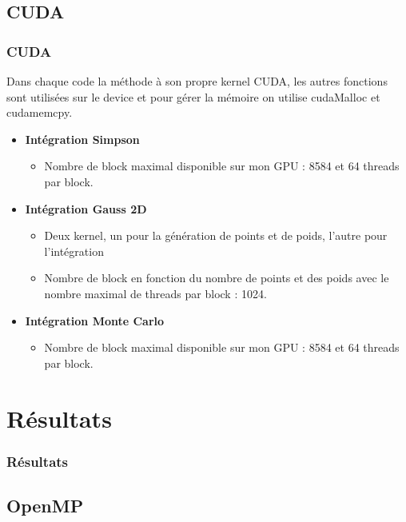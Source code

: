 \documentclass[10pt]{beamer}
\begin{document}
\subsection{CUDA}
\begin{frame}
    \frametitle{CUDA}
        \small
    Dans chaque code la méthode à son propre kernel CUDA, les autres fonctions sont utilisées sur le device et pour gérer la mémoire on utilise cudaMalloc et cudamemcpy.
    \begin{itemize}
     \item \textbf{Intégration Simpson}
            \begin{itemize}
                \item Nombre de block maximal disponible sur mon GPU : 8584 et 64 threads par block.
            \end{itemize}
        \item \textbf{Intégration Gauss 2D}
            \begin{itemize}
                \item Deux kernel, un pour la génération de points et de poids, l'autre pour l'intégration
                \item Nombre de block en fonction du nombre de points et des poids avec le nombre maximal de threads par block : 1024. 
            \end{itemize}
        \item \textbf{Intégration Monte Carlo }
            \begin{itemize}
                \item Nombre de block maximal disponible sur mon GPU : 8584 et 64 threads par block.
            \end{itemize}
        
       
    \end{itemize}
\end{frame}

\section{Résultats}

\begin{frame}
    \frametitle{Résultats}
    \tableofcontents[currentsection]
\end{frame}

\subsection{OpenMP}
\end{document}
